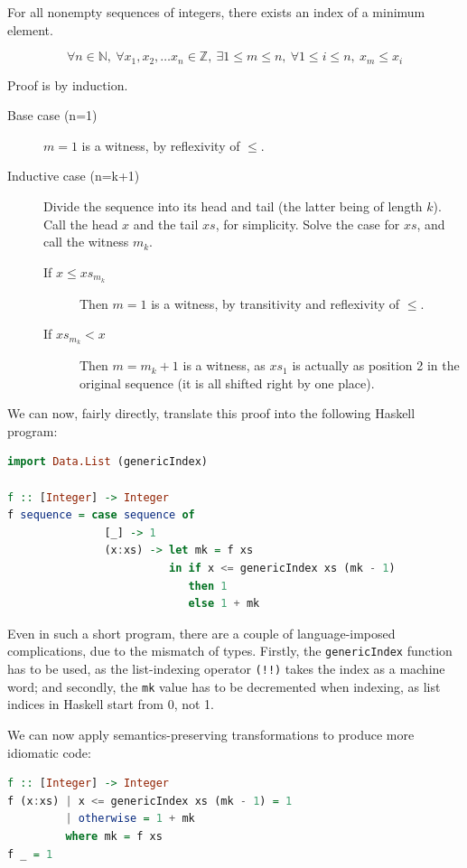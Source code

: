 \begin{example}
\label{exmpl:lit-extraction}
For all nonempty sequences of integers, there exists an index of a
minimum element.

\[\forall n \in \mathbb N,\
\forall x_{1}, x_{2}, \ldots x_{n} \in \mathbb Z,\ 
\exists 1 \leq m \leq n,\ 
\forall 1 \leq i \leq n,\ 
x_{m} \leq x_{i}\]

Proof is by induction.

\begin{description}
  \item[Base case (n=1)] $m = 1$ is a witness, by reflexivity of
    $\leq$.

  \item[Inductive case (n=k+1)] Divide the sequence into its head
    and tail (the latter being of length $k$). Call the head $x$ and
    the tail $xs$, for simplicity. Solve the case for $xs$, and call
    the witness $m_{k}$.
    \begin{description}
      \item[If $x \leq xs_{m_k}$] Then $m = 1$ is a witness, by
        transitivity and reflexivity of $\leq$.

      \item[If $xs_{m_k} < x$] Then $m = m_{k} + 1$ is a witness, as
        $xs_{1}$ is actually as position 2 in the original sequence
        (it is all shifted right by one place).
    \end{description}
\end{description}

We can now, fairly directly, translate this proof into the following
Haskell program:

\begin{lstlisting}[language=haskell]
import Data.List (genericIndex)

f :: [Integer] -> Integer
f sequence = case sequence of
               [_] -> 1
               (x:xs) -> let mk = f xs
                         in if x <= genericIndex xs (mk - 1)
                            then 1
                            else 1 + mk
\end{lstlisting}

Even in such a short program, there are a couple of language-imposed
complications, due to the mismatch of types. Firstly, the
\texttt{genericIndex} function has to be used, as the list-indexing
operator \texttt{(!!)} takes the index as a machine word; and
secondly, the \texttt{mk} value has to be decremented when indexing,
as list indices in Haskell start from 0, not 1.

We can now apply semantics-preserving transformations to produce more
idiomatic code:

\begin{lstlisting}[language=haskell]
f :: [Integer] -> Integer
f (x:xs) | x <= genericIndex xs (mk - 1) = 1
         | otherwise = 1 + mk
         where mk = f xs
f _ = 1
\end{lstlisting}
\end{example}

